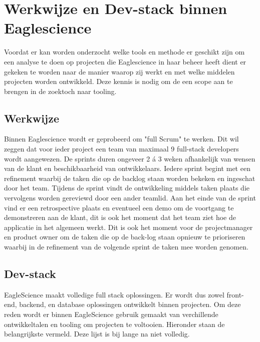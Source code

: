 \section{Werkwijze en Dev-stack binnen Eaglescience}\label{sec:werkwijze-en-dev-stack-binnen-eaglescience}
Voordat er kan worden onderzocht welke tools en methode er geschikt zijn om een analyse te doen op projecten die Eaglescience in haar beheer heeft dient er gekeken te worden naar de manier waarop zij werkt en met welke middelen projecten worden ontwikkeld. Deze kennis is nodig om de een scope aan te brengen in de zoektoch naar tooling.

\subsection{Werkwijze}\label{subsec:ESwerkwijze}
Binnen Eaglescience wordt er geprobeerd om "full Scrum" te werken. Dit wil zeggen dat voor ieder project een team van maximaal 9 full-stack developers wordt aangewezen. De sprints duren ongeveer 2 á 3 weken afhankelijk van wensen van de klant en beschikbaarheid van ontwikkelaars. Iedere sprint begint met een refinement waarbij de taken die op de backlog staan worden bekeken en ingeschat door het team. Tijdens de sprint vindt de ontwikkeling middels taken plaats die vervolgens worden gereviewd door een ander teamlid. Aan het einde van de sprint vind er een retrospective plaats en eventueel een demo om de voortgang te demonstreren aan de klant, dit is ook het moment dat het team ziet hoe de applicatie in het algemeen werkt. Dit is ook het moment voor de projectmanager en product owner om de taken die op de back-log staan opnieuw te prioriseren waarbij in de refinement van de volgende sprint de taken mee worden genomen.

\subsection{Dev-stack}\label{subsec:ESdev-stack}
EagleScience maakt volledige full stack oplossingen. Er wordt dus zowel front-end, backend, en database oplossingen ontwikkelt binnen projecten. Om deze reden wordt er binnen EagleScience gebruik gemaakt van verchillende ontwikkeltalen en tooling om projecten te voltooien. Hieronder staan de belangrijkste vermeld. Deze lijst is bij lange na niet volledig.

